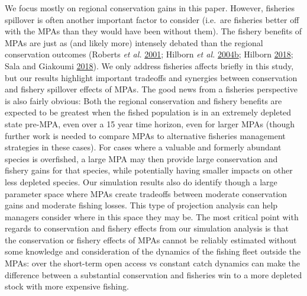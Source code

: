\documentclass[twoside,12pt,final]{ucthesis-CA2012}
\begin{document}
\begin{ucmainmatter}
We focus mostly on regional conservation gains in this paper. However,
fisheries spillover is often another important factor to consider
(i.e.~are fisheries better off with the MPAs than they would have been
without them). The fishery benefits of MPAs are just as (and likely
more) intensely debated than the regional conservation outcomes (Roberts
\emph{et al.} \protect\hyperlink{ref-Roberts2001}{2001}; Hilborn
\emph{et al.}
\protect\hyperlink{ref-Hilborn2004}{2004}\protect\hyperlink{ref-Hilborn2004}{b};
Hilborn \protect\hyperlink{ref-Hilborn2018}{2018}; Sala and Giakoumi
\protect\hyperlink{ref-Sala2018b}{2018}). We only address fisheries
affects briefly in this study, but our results highlight important
tradeoffs and synergies between conservation and fishery spillover
effects of MPAs. The good news from a fisheries perspective is also
fairly obvious: Both the regional conservation and fishery benefits are
expected to be greatest when the fished population is in an extremely
depleted state pre-MPA, even over a 15 year time horizon, even for
larger MPAs (though further work is needed to compare MPAs to
alternative fisheries management strategies in these cases). For cases
where a valuable and formerly abundant species is overfished, a large
MPA may then provide large conservation and fishery gains for that
species, while potentially having smaller impacts on other less depleted
species. Our simulation results also do identify though a large
parameter space where MPAs create tradeoffs between moderate
conservation gains and moderate fishing losses. This type of projection
analysis can help managers consider where in this space they may be. The
most critical point with regards to conservation and fishery effects
from our simulation analysis is that the conservation or fishery effects
of MPAs cannot be reliably estimated without some knowledge and
consideration of the dynamics of the fishing fleet outside the MPAs:
over the short-term open access vs constant catch dynamics can make the
difference between a substantial conservation and fisheries win to a
more depleted stock with more expensive fishing.


\end{ucmainmatter}
\end{document}
